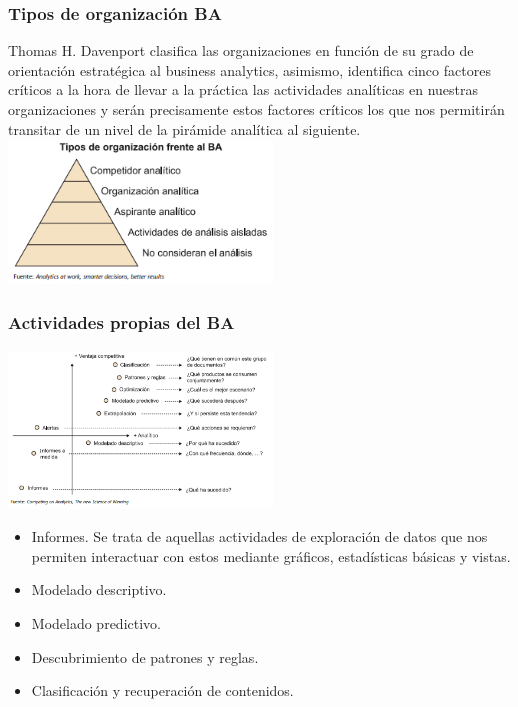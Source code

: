 \documentclass[twoside,twocolumn]{article}
\begin{document}
\subsubsection{Tipos de organización BA}

Thomas H. Davenport clasifica las organizaciones en función de su grado de orientación estratégica al business analytics, asimismo, identifica cinco factores críticos a la hora de llevar a la práctica las actividades analíticas en nuestras organizaciones y serán precisamente estos factores críticos los que nos permitirán transitar de un nivel de la pirámide analítica al siguiente.
\includegraphics[width=7cm]{imagenes/tipos.png}

\subsubsection{Actividades propias del BA}
\includegraphics[width=7cm]{imagenes/actividades.png}

\begin{itemize}
    \item   Informes. Se trata de aquellas actividades de exploración de datos que nos permiten interactuar con estos mediante gráficos, estadísticas básicas y vistas.
    \item   Modelado descriptivo. 
    \item   Modelado predictivo. 
    \item   Descubrimiento de patrones y reglas. 
    \item   Clasificación y recuperación de contenidos. 
\end{itemize}
\end{document}
